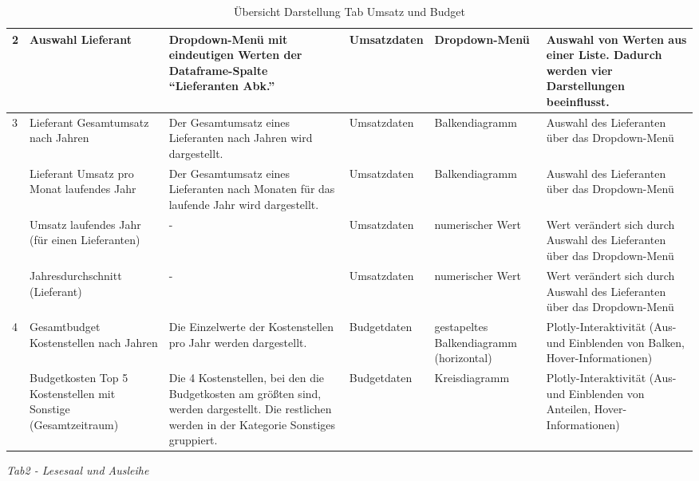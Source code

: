 \begin{table}[h]
\begin{adjustbox}{max width=\textwidth}
\begin{tabular}{p{}p{}p{}p{}p{}p{}}
                        \midrule
            2           &Auswahl  Lieferant &Dropdown-Menü mit eindeutigen Werten der Dataframe-Spalte \enquote{Lieferanten Abk.}&Umsatzdaten&Dropdown-Menü &Auswahl von Werten aus einer Liste. Dadurch werden vier Darstellungen beeinflusst.\\
            \midrule
            3           &Lieferant Gesamtumsatz nach Jahren&Der Gesamtumsatz eines Lieferanten nach Jahren wird dargestellt.   &Umsatzdaten    &Balkendiagramm    &Auswahl des Lieferanten über das Dropdown-Menü\\
                        &Lieferant Umsatz pro Monat laufendes Jahr&Der Gesamtumsatz eines Lieferanten nach Monaten für das laufende Jahr wird dargestellt.   &Umsatzdaten    &Balkendiagramm    &Auswahl des Lieferanten über das Dropdown-Menü\\
                        &Umsatz laufendes Jahr (für einen Lieferanten)&- &Umsatzdaten    &numerischer Wert    &Wert verändert sich durch Auswahl des Lieferanten über das Dropdown-Menü\\
                        &Jahresdurchschnitt (Lieferant)&- &Umsatzdaten    &numerischer Wert    &Wert verändert sich durch Auswahl des Lieferanten über das Dropdown-Menü\\
            \midrule
            4           &Gesamtbudget Kostenstellen nach Jahren&Die Einzelwerte der Kostenstellen pro Jahr werden dargestellt.&Budgetdaten    &gestapeltes Balkendiagramm (horizontal)    &Plotly-Interaktivität (Aus- und Einblenden von Balken, Hover-Informationen)\\
                        &Budgetkosten Top 5 Kostenstellen mit Sonstige (Gesamtzeitraum)&Die 4 Kostenstellen, bei den die Budgetkosten am größten sind, werden dargestellt. Die restlichen werden in der Kategorie Sonstiges gruppiert. &Budgetdaten    &Kreisdiagramm    &Plotly-Interaktivität (Aus- und Einblenden von Anteilen, Hover-Informationen)\\

        \bottomrule
        \end{tabular}
        \end{adjustbox}
        \caption{%
            Übersicht Darstellung Tab Umsatz und Budget
        }
        \label{tab:Darstellung Tab Umsatz und Budget}
        \end{table}
    \endgroup
    


\clearpage
\noindent
\textit{Tab2 - Lesesaal und Ausleihe}

